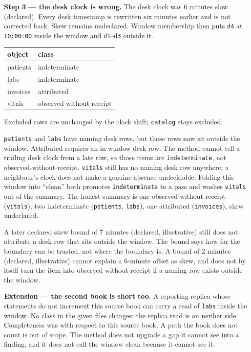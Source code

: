 \documentclass[11pt]{article}
\begin{document}
\textbf{Step 3 --- the desk clock is wrong.} The desk clock was 6 minutes slow (declared). Every desk timestamp is rewritten six minutes earlier and is not corrected back. Skew remains undeclared. Window membership then puts \texttt{d4} at \texttt{10:00:00} inside the window and \texttt{d1}--\texttt{d3} outside it.

\begin{tabular}{ll}
\toprule
object & class \\
\midrule
patients & indeterminate \\
labs & indeterminate \\
invoices & attributed \\
vitals & observed-without-receipt \\
\bottomrule
\end{tabular}

\vspace{1em}

Excluded rows are unchanged by the clock shift; \texttt{catalog} stays excluded.

\texttt{patients} and \texttt{labs} have naming desk rows, but those rows now sit outside the window. Attributed requires an in-window desk row. The method cannot tell a trailing desk clock from a late row, so those items are \texttt{indeterminate}, not observed-without-receipt. \texttt{vitals} still has no naming desk row anywhere; a neighbour's clock does not make a genuine absence undecidable. Folding this window into ``clean'' both promotes \texttt{indeterminate} to a pass and washes \texttt{vitals} out of the summary. The honest summary is one observed-without-receipt (\texttt{vitals}), two indeterminate (\texttt{patients}, \texttt{labs}), one attributed (\texttt{invoices}), skew undeclared.

A later declared skew bound of 7 minutes (declared, illustrative) still does not attribute a desk row that sits outside the window. The bound says how far the boundary can be trusted, not where the boundary is. A bound of 2 minutes (declared, illustrative) cannot explain a 6-minute offset as skew, and does not by itself turn the item into observed-without-receipt if a naming row exists outside the window.

\textbf{Extension --- the second book is short too.} A reporting replica whose statements do not increment this source book can carry a read of \texttt{labs} inside the window. No class in the given files changes: the replica read is on neither side. Completeness was with respect to this source book. A path the book does not count is out of scope. The method does not upgrade a gap it cannot see into a finding, and it does not call the window clean because it cannot see it.
\end{document}

